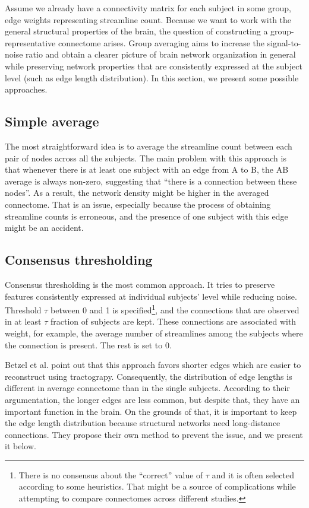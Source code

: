 Assume we already have a connectivity matrix for each subject in some group, edge weights representing streamline count. Because we want to work with the general structural properties of the brain, the question of constructing a group-representative connectome arises. Group averaging aims to increase the signal-to-noise ratio and obtain a clearer picture of brain network organization in general while preserving network properties that are consistently expressed at the subject level (such as edge length distribution). \cite{betzel_distance-dependent_2019} In this section, we present some possible approaches.

\subsection{Simple average}\label{sec:average}

The most straightforward idea is to average the streamline count between each pair of nodes across all the subjects. The main problem with this approach is that whenever there is at least one subject with an edge from A to B, the AB average is always non-zero, suggesting that \enquote{there is a connection between these nodes}. As a result, the network density might be higher in the averaged connectome. That is an issue, especially because the process of obtaining streamline counts is erroneous, and the presence of one subject with this edge might be an accident.

\subsection{Consensus thresholding}\label{sec:cons-thr}

Consensus thresholding is the most common approach. It tries to preserve features consistently expressed at individual subjects' level while reducing noise. Threshold $\tau$ between 0 and 1 is specified\footnote{There is no consensus about the \enquote{correct} value of $\tau$ and it is often selected according to some heuristics. That might be a source of complications while attempting to compare connectomes across different studies.}, and the connections that are observed in at least $\tau$ fraction of subjects are kept. These connections are associated with weight, for example, the average number of streamlines among the subjects where the connection is present. The rest is set to 0. \cite{betzel_distance-dependent_2019}

Betzel et al. point out that this approach favors shorter edges which are easier to reconstruct using tractograpy. Consequently, the distribution of edge lengths is different in average connectome than in the single subjects. According to their argumentation, the longer edges are less common, but despite that, they have an important function in the brain. On the grounds of that, it is important to keep the edge length distribution because structural networks need long-distance connections. They propose their own method to prevent the issue, and we present it below. \cite{betzel_distance-dependent_2019} 

